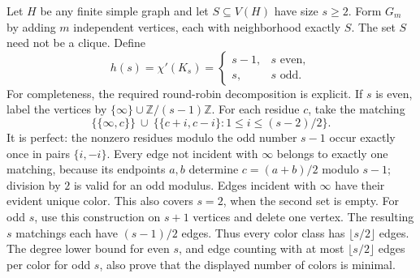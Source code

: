 \documentclass[11pt]{article}
\begin{document}
Let $H$ be any finite
simple graph and let $S\subseteq V(H)$ have size $s\geq2$. Form $G_m$ by
adding $m$ independent vertices, each with neighborhood exactly $S$.
The set $S$ need not be a clique.
Define
\[
 h(s)=\chi'(K_s)=
 \begin{cases}s-1,&s\text{ even},\\s,&s\text{ odd}.\end{cases}
\]
For completeness, the required round-robin decomposition is explicit.
If $s$ is even, label the vertices by $\{\infty\}\cup\mathbb Z/(s-1)\mathbb Z$.
For each residue $c$, take the matching
\[
 \{\{\infty,c\}\}\ \cup\
 \{\{c+i,c-i\}:1\leq i\leq(s-2)/2\}.
\]
It is perfect: the nonzero residues modulo the odd number $s-1$ occur
exactly once in pairs $\{i,-i\}$. Every edge not incident with $\infty$
belongs to exactly one matching, because its endpoints $a,b$ determine
$c=(a+b)/2$ modulo $s-1$; division by $2$ is valid for an odd modulus.
Edges incident with $\infty$ have their evident unique color. This also
covers $s=2$, when the second set is empty. For odd $s$, use this
construction on $s+1$ vertices and delete one vertex. The resulting
$s$ matchings each have $(s-1)/2$ edges. Thus every color class has
$\lfloor s/2\rfloor$ edges. The degree lower bound for even $s$, and
edge counting with at most $\lfloor s/2\rfloor$ edges per color for odd
$s$, also prove that the displayed number of colors is minimal.
\end{document}
